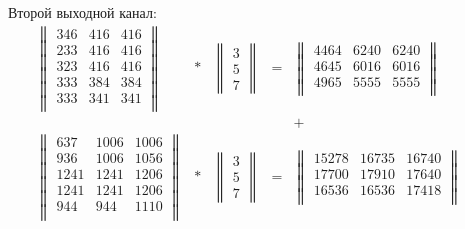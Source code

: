 \documentclass[12pt, a4paper]{extarticle}
\begin{document}
\begin{enumerate}
        Второй выходной канал:
        \begin{equation}
        \begin{array}{rcccccc}
            \begin{Vmatrix}
                346 & 416 & 416 \\
                233 & 416 & 416 \\
                323 & 416 & 416 \\
                333 & 384 & 384 \\
                333 & 341 & 341 \\
            \end{Vmatrix}
            & \ast & 
            \begin{Vmatrix}
                3 \\ 5 \\ 7
            \end{Vmatrix} 
            & = &
            \begin{Vmatrix}
                4464 & 6240 & 6240 \\
                4645 & 6016 & 6016 \\
                4965 & 5555 & 5555 \\
            \end{Vmatrix} & & \\
            & & & & + & & \\
            \begin{Vmatrix}
                637 & 1006 & 1006 \\
                936 & 1006 & 1056 \\
                1241 & 1241 & 1206 \\
                1241 & 1241 & 1206 \\
                944 & 944 & 1110 \\
            \end{Vmatrix}
            & \ast &
            \begin{Vmatrix}
                3 \\ 5 \\ 7
            \end{Vmatrix} 
            & = & 
            \begin{Vmatrix}
                15278 & 16735 & 16740 \\
                17700 & 17910 & 17640 \\
                16536 & 16536 & 17418 \\
            \end{Vmatrix} 

\end{array}
\end{equation}
\end{enumerate}
\end{document}
